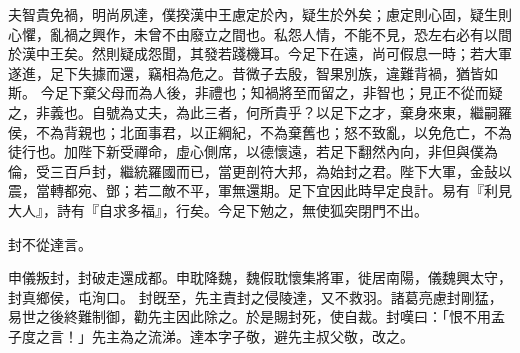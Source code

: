 \begin{pinyinscope}
 
夫智貴免禍，明尚夙達，僕揆漢中王慮定於內，疑生於外矣；慮定則心固，疑生則心懼，亂禍之興作，未曾不由廢立之間也。私怨人情，不能不見，恐左右必有以間於漢中王矣。然則疑成怨聞，其發若踐機耳。今足下在遠，尚可假息一時；若大軍遂進，足下失據而還，竊相為危之。昔微子去殷，智果別族，違難背禍，猶皆如斯。
 今足下棄父母而為人後，非禮也；知禍將至而留之，非智也；見正不從而疑之，非義也。自號為丈夫，為此三者，何所貴乎？以足下之才，棄身來東，繼嗣羅侯，不為背親也；北面事君，以正綱紀，不為棄舊也；怒不致亂，以免危亡，不為徒行也。加陛下新受禪命，虛心側席，以德懷遠，若足下翻然內向，非但與僕為倫，受三百戶封，繼統羅國而已，當更剖符大邦，為始封之君。陛下大軍，金鼔以震，當轉都宛、鄧；若二敵不平，軍無還期。足下宜因此時早定良計。易有『利見大人』，詩有『自求多福』，行矣。今足下勉之，無使狐突閉門不出。
 
 
 
 
 封不從達言。
 
 
申儀叛封，封破走還成都。申耽降魏，魏假耽懷集將軍，徙居南陽，儀魏興太守，封真鄉侯，屯洵口。
 封旣至，先主責封之侵陵達，又不救羽。諸葛亮慮封剛猛，易世之後終難制御，勸先主因此除之。於是賜封死，使自裁。封嘆曰：「恨不用孟子度之言！」先主為之流涕。達本字子敬，避先主叔父敬，改之。
 
 
\end{pinyinscope}